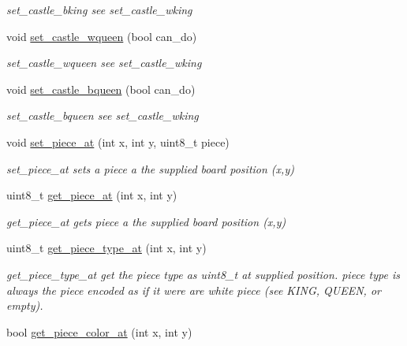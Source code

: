 \begin{DoxyCompactItemize}
\begin{DoxyCompactList}\small\item\em set\-\_\-castle\-\_\-bking see set\-\_\-castle\-\_\-wking \end{DoxyCompactList}\item 
void \hyperlink{classchess_1_1Board_aea1a6532bae11d8c2b1e54786082243a}{set\-\_\-castle\-\_\-wqueen} (bool can\-\_\-do)
\begin{DoxyCompactList}\small\item\em set\-\_\-castle\-\_\-wqueen see set\-\_\-castle\-\_\-wking \end{DoxyCompactList}\item 
void \hyperlink{classchess_1_1Board_abb70e7236fa809317a98453a2195c336}{set\-\_\-castle\-\_\-bqueen} (bool can\-\_\-do)
\begin{DoxyCompactList}\small\item\em set\-\_\-castle\-\_\-bqueen see set\-\_\-castle\-\_\-wking \end{DoxyCompactList}\item 
void \hyperlink{classchess_1_1Board_a8b86c20aa1698b9418e95517da36f49a}{set\-\_\-piece\-\_\-at} (int x, int y, uint8\-\_\-t piece)
\begin{DoxyCompactList}\small\item\em set\-\_\-piece\-\_\-at sets a piece a the supplied board position (x,y) \end{DoxyCompactList}\item 
uint8\-\_\-t \hyperlink{classchess_1_1Board_a11ee306cf1bed5aa97c99b90fa2462e9}{get\-\_\-piece\-\_\-at} (int x, int y)
\begin{DoxyCompactList}\small\item\em get\-\_\-piece\-\_\-at gets piece a the supplied board position (x,y) \end{DoxyCompactList}\item 
uint8\-\_\-t \hyperlink{classchess_1_1Board_a335cf36085d8de6a2ad784f12fa3ea87}{get\-\_\-piece\-\_\-type\-\_\-at} (int x, int y)
\begin{DoxyCompactList}\small\item\em get\-\_\-piece\-\_\-type\-\_\-at get the piece type as uint8\-\_\-t at supplied position. piece type is always the piece encoded as if it were are white piece (see K\-I\-N\-G, Q\-U\-E\-E\-N, or empty). \end{DoxyCompactList}\item 
bool \hyperlink{classchess_1_1Board_a0cc8ee041129aee3d29d8dca68379f5e}{get\-\_\-piece\-\_\-color\-\_\-at} (int x, int y)

\end{DoxyCompactItemize}
